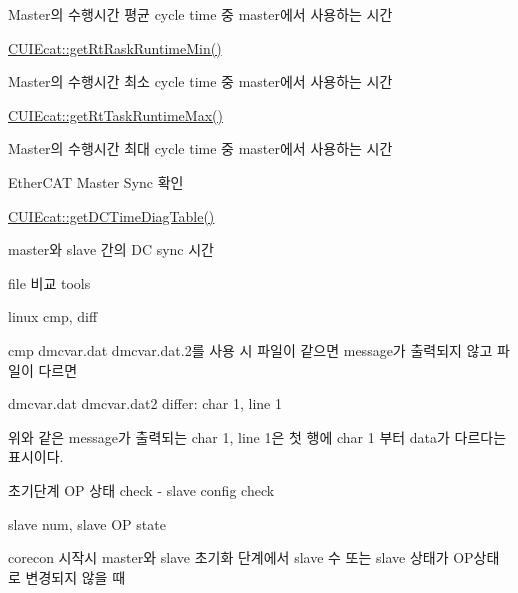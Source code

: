 \begin{DoxyEnumerate}
\begin{DoxyItemize}
\begin{DoxyItemize}
\item Master의 수행시간 평균 cycle time 중 master에서 사용하는 시간
\end{DoxyItemize}
\item \hyperlink{classCUIEcat_a563eabb48053cfa9ec88213b96914179}{C\-U\-I\-Ecat\-::get\-Rt\-Rask\-Runtime\-Min()}
\begin{DoxyItemize}
\item Master의 수행시간 최소 cycle time 중 master에서 사용하는 시간
\end{DoxyItemize}
\item \hyperlink{classCUIEcat_a49de2bbe30a82bd57c5c3ce86234fece}{C\-U\-I\-Ecat\-::get\-Rt\-Task\-Runtime\-Max()}
\begin{DoxyItemize}
\item Master의 수행시간 최대 cycle time 중 master에서 사용하는 시간
\end{DoxyItemize}
\end{DoxyItemize}
\item Ether\-C\-A\-T Master Sync 확인
\begin{DoxyItemize}
\item \hyperlink{classCUIEcat_aa3925bea5f3005eb3148258af76bbb56}{C\-U\-I\-Ecat\-::get\-D\-C\-Time\-Diag\-Table()}
\begin{DoxyItemize}
\item master와 slave 간의 D\-C sync 시간
\end{DoxyItemize}
\end{DoxyItemize}
\item file 비교 tools
\begin{DoxyItemize}
\item linux cmp, diff
\begin{DoxyItemize}
\item cmp dmcvar.\-dat dmcvar.\-dat.\-2를 사용 시 파일이 같으면 message가 출력되지 않고 파일이 다르면
\item dmcvar.\-dat dmcvar.\-dat2 differ\-: char 1, line 1
\item 위와 같은 message가 출력되는 char 1, line 1은 첫 행에 char 1 부터 data가 다르다는 표시이다.
\end{DoxyItemize}
\end{DoxyItemize}
\item 초기단계 O\-P 상태 check -\/ slave config check
\begin{DoxyItemize}
\item slave num, slave O\-P state
\item corecon 시작시 master와 slave 초기화 단계에서 slave 수 또는 slave 상태가 O\-P상태로 변경되지 않을 때

\end{DoxyItemize}
\end{DoxyEnumerate}
